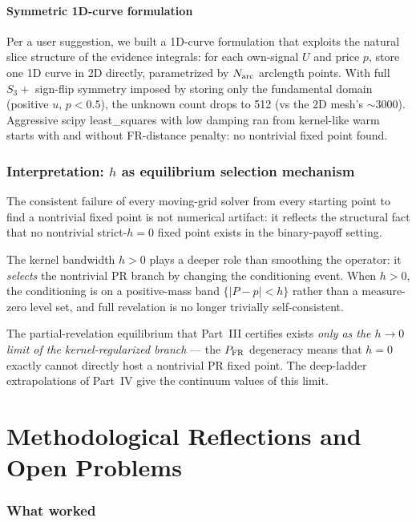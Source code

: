 \documentclass[11pt]{article}
\newcommand{\1}{\mathbf{1}}
\newcommand{\PFR}{P_{\rm FR}}
\begin{document}
\subsection{Symmetric 1D-curve formulation}

Per a user suggestion, we built a 1D-curve formulation that exploits
the natural slice structure of the evidence integrals: for each
own-signal $U$ and price $p$, store one 1D curve in 2D directly,
parametrized by $N_{\rm arc}$ arclength points.  With full $S_3 +$
sign-flip symmetry imposed by storing only the fundamental domain
(positive $u$, $p < 0.5$), the unknown count drops to 512 (vs the 2D
mesh's $\sim 3000$).  Aggressive scipy least\_squares with low
damping ran from kernel-like warm starts with and without FR-distance
penalty: no nontrivial fixed point found.

\section{Interpretation: $h$ as equilibrium selection mechanism}

The consistent failure of every moving-grid solver from every starting
point to find a nontrivial fixed point is not numerical artifact: it
reflects the structural fact that no nontrivial strict-$h=0$ fixed
point exists in the binary-payoff setting.

The kernel bandwidth $h > 0$ plays a deeper role than smoothing
the operator: it \emph{selects} the nontrivial PR branch by changing
the conditioning event.  When $h > 0$, the conditioning is on a
positive-mass band $\{|P - p| < h\}$ rather than a measure-zero level
set, and full revelation is no longer trivially self-consistent.

The partial-revelation equilibrium that Part~III certifies exists
\emph{only as the $h \to 0$ limit of the kernel-regularized branch} ---
the $\PFR$ degeneracy means that $h = 0$ exactly cannot directly host a
nontrivial PR fixed point.  The deep-ladder extrapolations of Part~IV
give the continuum values of this limit.

\part{Methodological Reflections and Open Problems}

\section{What worked}
\end{document}
